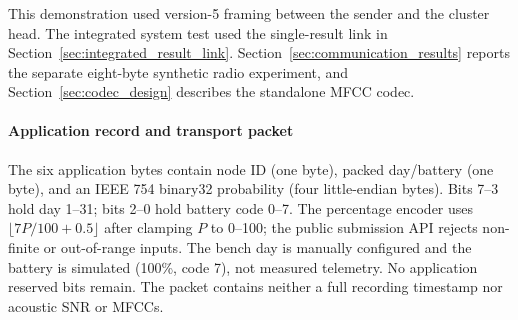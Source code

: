 \subsubsection{}
\label{sec:communication_protocol}
\begingroup
\color{black}
This demonstration used version-5 framing between the sender and the cluster head. The integrated system test used the single-result link in Section~\ref{sec:integrated_result_link}. Section~\ref{sec:communication_results} reports the separate eight-byte synthetic radio experiment, and Section~\ref{sec:codec_design} describes the standalone MFCC codec.

\paragraph{Application record and transport packet}
The six application bytes contain node ID (one byte), packed day/battery (one byte), and an IEEE 754 binary32 probability (four little-endian bytes). Bits 7--3 hold day 1--31; bits 2--0 hold battery code 0--7. The percentage encoder uses $\lfloor 7P/100+0.5\rfloor$ after clamping $P$ to 0--100; the public submission API rejects non-finite or out-of-range inputs. The bench day is manually configured and the battery is simulated (100\%, code 7), not measured telemetry. No application reserved bits remain. The packet contains neither a full recording timestamp nor acoustic SNR or MFCCs.

